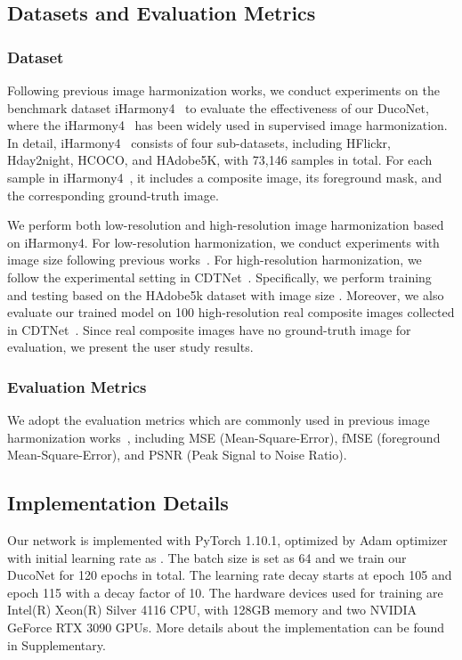 \documentclass[sigconf]{acmart}
\begin{document}
\subsection{Datasets and Evaluation Metrics}
\subsubsection{Dataset} 
Following previous image harmonization works, we conduct experiments on the benchmark dataset iHarmony4~\cite{dovenet} to evaluate the effectiveness of our DucoNet, where the iHarmony4~\cite{dovenet} has been widely used in supervised image harmonization. 
In detail, iHarmony4~\cite{dovenet} consists of four sub-datasets, including HFlickr, Hday2night, HCOCO, and HAdobe5K, with 73,146 samples in total.
For each sample in iHarmony4~\cite{dovenet}, it includes a composite image, its foreground mask, and the corresponding ground-truth image.

We perform both low-resolution and high-resolution image harmonization based on iHarmony4. 
For low-resolution harmonization, we conduct experiments with image size  following previous works~\cite{issam}.
For high-resolution harmonization, we follow the experimental setting in CDTNet~\cite{CDTNet}. Specifically, we perform training and testing based on the HAdobe5k dataset with image size . 
Moreover, we also evaluate our trained model on 100 high-resolution real composite images collected in CDTNet~\cite{CDTNet}. 
Since real composite images have no ground-truth image for evaluation, we present the user study results.

\subsubsection{Evaluation Metrics} 
We adopt the evaluation metrics which are commonly used in previous image harmonization works~\cite{dovenet,IHT,issam,CDTNet,harmonizer,DCCF}, including MSE (Mean-Square-Error), fMSE (foreground Mean-Square-Error), and PSNR (Peak Signal to Noise Ratio).

\subsection{Implementation Details}

Our network is implemented with PyTorch 1.10.1, optimized by Adam optimizer with initial learning rate as .
The batch size is set as 64 and we train our DucoNet for 120 epochs in total.
The learning rate decay starts at epoch 105 and epoch 115 with a decay factor of 10. 
The hardware devices used for training are Intel(R) Xeon(R) Silver 4116 CPU, with 128GB memory and two NVIDIA GeForce RTX 3090 GPUs.
More details about the implementation can be found in Supplementary.
\end{document}
